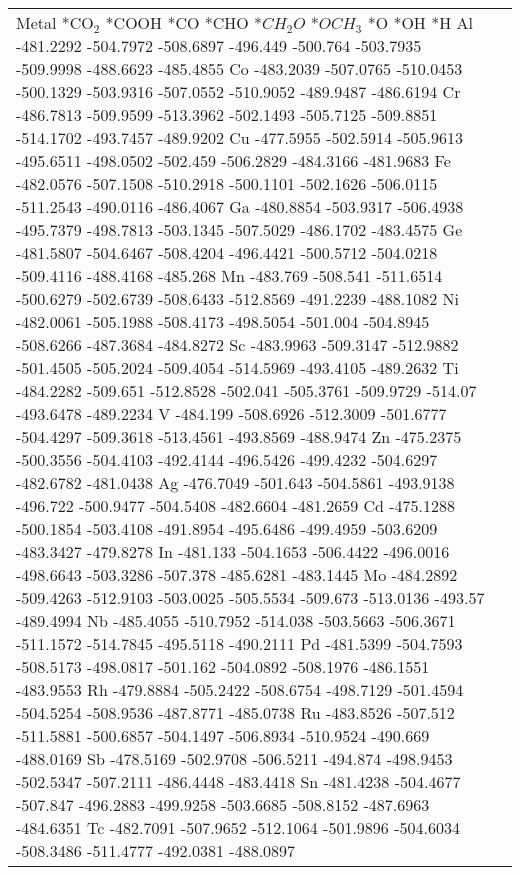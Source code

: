 \begin{table}[h]
    \centering
    \begin{tabular}{lr}
      \hline
      Metal	*CO$_2$	*COOH	*CO	*CHO	*$CH_2O$	*$OCH_3$	*O	*OH	*H
      \hline
      Al	-481.2292	-504.7972	-508.6897	-496.449	-500.764	-503.7935	-509.9998	-488.6623	-485.4855
      Co	-483.2039	-507.0765	-510.0453	-500.1329	-503.9316	-507.0552	-510.9052	-489.9487	-486.6194
      Cr	-486.7813	-509.9599	-513.3962	-502.1493	-505.7125	-509.8851	-514.1702	-493.7457	-489.9202
      Cu	-477.5955	-502.5914	-505.9613	-495.6511	-498.0502	-502.459	-506.2829	-484.3166	-481.9683
      Fe	-482.0576	-507.1508	-510.2918	-500.1101	-502.1626	-506.0115	-511.2543	-490.0116	-486.4067
      Ga	-480.8854	-503.9317	-506.4938	-495.7379	-498.7813	-503.1345	-507.5029	-486.1702	-483.4575
      Ge	-481.5807	-504.6467	-508.4204	-496.4421	-500.5712	-504.0218	-509.4116	-488.4168	-485.268
      Mn	-483.769	-508.541	-511.6514	-500.6279	-502.6739	-508.6433	-512.8569	-491.2239	-488.1082
      Ni	-482.0061	-505.1988	-508.4173	-498.5054	-501.004	-504.8945	-508.6266	-487.3684	-484.8272
      Sc	-483.9963	-509.3147	-512.9882	-501.4505	-505.2024	-509.4054	-514.5969	-493.4105	-489.2632
      Ti	-484.2282	-509.651	-512.8528	-502.041	-505.3761	-509.9729	-514.07		-493.6478	-489.2234
      V	  -484.199	-508.6926	-512.3009	-501.6777	-504.4297	-509.3618	-513.4561	-493.8569	-488.9474
      Zn	-475.2375	-500.3556	-504.4103	-492.4144	-496.5426	-499.4232	-504.6297	-482.6782	-481.0438
      Ag	-476.7049	-501.643	-504.5861	-493.9138	-496.722	-500.9477	-504.5408	-482.6604	-481.2659
      Cd	-475.1288	-500.1854	-503.4108	-491.8954	-495.6486	-499.4959	-503.6209	-483.3427	-479.8278
      In	-481.133	-504.1653	-506.4422	-496.0016	-498.6643	-503.3286	-507.378	-485.6281	-483.1445
      Mo	-484.2892	-509.4263	-512.9103	-503.0025	-505.5534	-509.673	-513.0136	-493.57		-489.4994
      Nb	-485.4055	-510.7952	-514.038	-503.5663	-506.3671	-511.1572	-514.7845	-495.5118	-490.2111
      Pd	-481.5399	-504.7593	-508.5173	-498.0817	-501.162	-504.0892	-508.1976	-486.1551	-483.9553
      Rh	-479.8884	-505.2422	-508.6754	-498.7129	-501.4594	-504.5254	-508.9536	-487.8771	-485.0738
      Ru	-483.8526	-507.512	-511.5881	-500.6857	-504.1497	-506.8934	-510.9524	-490.669	-488.0169
      Sb	-478.5169	-502.9708	-506.5211	-494.874	-498.9453	-502.5347	-507.2111	-486.4448	-483.4418
      Sn	-481.4238	-504.4677	-507.847	-496.2883	-499.9258	-503.6685	-508.8152	-487.6963	-484.6351
      Tc	-482.7091	-507.9652	-512.1064	-501.9896	-504.6034	-508.3486	-511.4777	-492.0381	-488.0897

\end{tabular}
\end{table}
